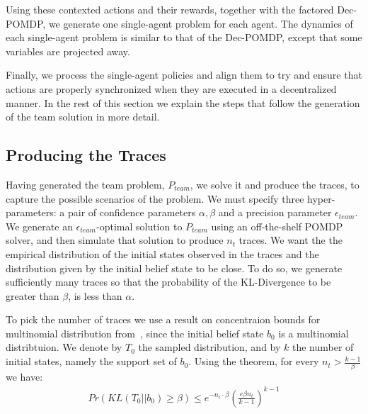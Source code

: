 \documentclass[letterpaper]{article} %
\theoremstyle{definition}
\begin{document}
Using these contexted actions and their rewards, together with the factored Dec-POMDP, we  generate
one single-agent problem for each agent. The dynamics of each single-agent problem is similar to that of the Dec-POMDP, except that some variables are projected away. 

Finally, we process the single-agent policies and align them to try and ensure that actions are properly synchronized when they are executed in a decentralized manner. 
In the rest of this section we explain the steps that follow the
generation of the team solution in more detail.


\subsection{Producing the Traces}

Having generated the team problem, $P_{team}$, we solve it and produce the traces, to capture the possible scenarios of the problem. We
must specify three hyper-parameters: a pair of confidence parameters $\alpha, \beta$ and a precision parameter $\epsilon_{team}$. We generate an $\epsilon_{team}$-optimal solution
to $P_{team}$ using an off-the-shelf POMDP solver, and then simulate that solution to produce $n_t$ traces.
We want the the empirical distribution of the initial states observed in the traces and the distribution given by the initial belief state to be close.
To do so, we generate sufficiently many traces so that the probability of the KL-Divergence to be greater than $\beta$, is less than $\alpha$.

To pick the number of traces we use
a result on concentraion bounds for multinomial distribution  from~\cite{KLDIV}, since the initial belief state $b_0$ is a multinomial distribtuion. We denote by $T_0$ the sampled distribution, and by $k$ the number of initial states, namely the support set of $b_0$. Using the theorem, for every $n_t > \frac{k-1}{\beta}$ we have:
\begin{align*}
    Pr(KL(T_0 || b_0) \geq \beta) \leq e^{-n_t \cdot \beta} \left( \frac{e \beta n_t}{k-1}\right)^{k-1}
\end{align*}
\end{document}
